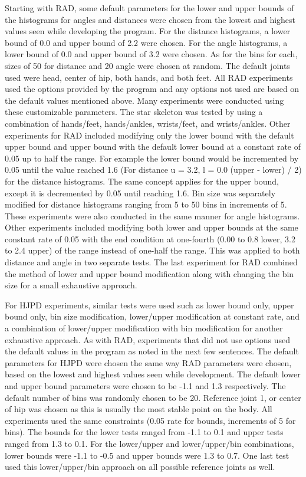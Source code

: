 \documentclass[11pt,nocopyrightspace]{config}
\begin{document}
Starting with RAD, some default parameters for the lower and upper bounds of the histograms for angles and distances were chosen from the lowest and highest values seen while developing the program. For the distance histograms, a lower bound of 0.0 and upper bound of 2.2 were chosen. For the angle histograms, a lower bound of 0.0 and upper bound of 3.2 were chosen. As for the bins for each, sizes of 50 for distance and 20 angle were chosen at random. The default joints used were head, center of hip, both hands,  and both feet. All RAD experiments used the options provided by the program and any options not used are based on the default values mentioned above. Many experiments were conducted using these customizable parameters. The star skeleton was tested by using a combination of hands/feet, hands/ankles, wrists/feet, and wrists/ankles. Other experiments for RAD included modifying only the lower bound with the default upper bound and upper bound with the default lower bound at a constant rate of 0.05 up to half the range. For example the lower bound would be incremented by 0.05 until the value reached 1.6 (For distance u = 3.2, l = 0.0 (upper - lower) / 2) for the distance histograms. The same concept applies for the upper bound, except it is decremented by 0.05 until reaching 1.6. Bin size was separately modified for distance histograms ranging from 5 to 50 bins in increments of 5. These experiments were also conducted in the same manner for angle histograms. Other experiments included modifying both lower and upper bounds at the same constant rate of 0.05 with the end condition at one-fourth (0.00 to 0.8 lower, 3.2 to 2.4 upper) of the range instead of one-half the range. This was applied to both distance and angle in two separate tests. The last experiment for RAD combined the method of lower and upper bound modification along with changing the bin size for a small exhaustive approach.

For HJPD experiments, similar tests were used such as lower bound only, upper bound only, bin size modification, lower/upper modification at constant rate, and a combination of lower/upper modification with bin modification for another exhaustive approach. As with RAD, experiments that did not use options used the default values in the program as noted in the next few sentences. The default parameters for HJPD were chosen the same way RAD parameters were chosen, based on the lowest and highest values seen while development. The default lower and upper bound parameters were chosen to be -1.1 and 1.3 respectively. The default number of bins was randomly chosen to be 20. Reference joint 1, or center of hip was chosen as this is usually the most stable point on the body. All experiments used the same constraints (0.05 rate for bounds, increments of 5 for bins). The bounds for the lower tests ranged from -1.1 to 0.1 and upper tests ranged from 1.3 to 0.1. For the lower/upper and lower/upper/bin combinations, lower bounds were -1.1 to -0.5 and upper bounds were 1.3 to 0.7. One last test used this lower/upper/bin approach on all possible reference joints as well. 
\end{document}
